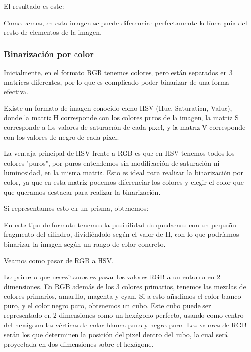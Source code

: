 El resultado es este:


Como vemos, en esta imagen se puede diferenciar perfectamente la línea guía del resto de elementos de la imagen.

\subsubsection{Binarización por color}
Inicialmente, en el formato RGB tenemos colores, pero están separados en 3 matrices diferentes, por lo que es complicado poder binarizar de una forma efectiva. 

Existe un formato de imagen conocido como HSV\cite{hsl_hsv} (Hue, Saturation, Value), donde la matriz H corresponde con los colores puros de la imagen, la matriz S corresponde a los valores de saturación de cada pixel, y la matriz V corresponde con los valores de negro de cada pixel.

La ventaja principal de HSV frente a RGB es que en HSV tenemos todos los colores "puros", por puros entendemos sin modificación de saturación ni luminosidad, en la misma matriz. Esto es ideal para realizar la binarización por color, ya que en esta matriz podemos diferenciar los colores y elegir el color que que queramos destacar para realizar la binarización.

Si representamos esto en un prisma, obtenemos:


En este tipo de formato tenemos la posibilidad de quedarnos con un pequeño fragmento del cilindro, dividiéndolo según el valor de H, con lo que podríamos binarizar la imagen según un rango de color concreto.

Veamos como pasar de RGB a HSV.

Lo primero que necesitamos es pasar los valores RGB a un entorno en 2 dimensiones. En RGB además de los 3 colores primarios, tenemos las mezclas de colores primarios, amarillo, magenta y cyan. Si a esto añadimos el color blanco puro, y el color negro puro, obtenemos un cubo. 
Este cubo puede ser representado en 2 dimensiones como un hexágono perfecto, usando como centro del hexágono los vértices de color blanco puro y negro puro. 
Los valores de RGB serán los que determinen la posición del pixel dentro del cubo, la cual será proyectada en dos dimensiones sobre el hexágono.


